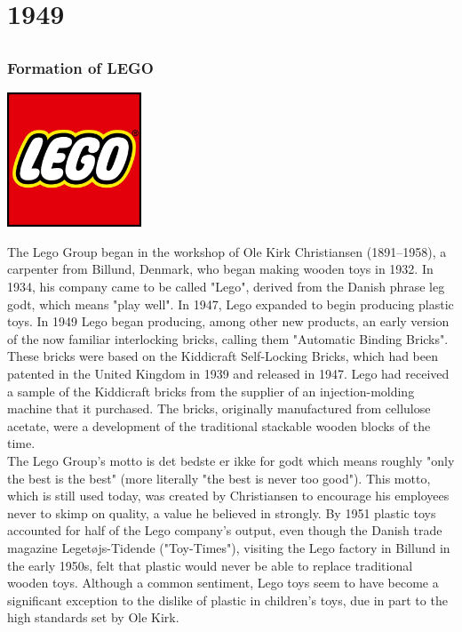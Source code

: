 \documentclass[11pt]{report}
\begin{document}
\chapter{1949}
\section{}
\subsection{Formation of LEGO}
\vspace{2mm}\begin{center}\includegraphics[width=4cm]{./img/legoLogo.jpg}\end{center}
The Lego Group began in the workshop of Ole Kirk Christiansen (1891–1958), a carpenter from Billund, Denmark, who began making wooden toys in 1932. In 1934, his company came to be called "Lego", derived from the Danish phrase leg godt, which means "play well". In 1947, Lego expanded to begin producing plastic toys. In 1949 Lego began producing, among other new products, an early version of the now familiar interlocking bricks, calling them "Automatic Binding Bricks". These bricks were based on the Kiddicraft Self-Locking Bricks, which had been patented in the United Kingdom in 1939 and released in 1947. Lego had received a sample of the Kiddicraft bricks from the supplier of an injection-molding machine that it purchased. The bricks, originally manufactured from cellulose acetate, were a development of the traditional stackable wooden blocks of the time.\\
\indent The Lego Group's motto is det bedste er ikke for godt which means roughly "only the best is the best" (more literally "the best is never too good"). This motto, which is still used today, was created by Christiansen to encourage his employees never to skimp on quality, a value he believed in strongly. By 1951 plastic toys accounted for half of the Lego company's output, even though the Danish trade magazine Legetøjs-Tidende ("Toy-Times"), visiting the Lego factory in Billund in the early 1950s, felt that plastic would never be able to replace traditional wooden toys. Although a common sentiment, Lego toys seem to have become a significant exception to the dislike of plastic in children's toys, due in part to the high standards set by Ole Kirk.
\end{document}
